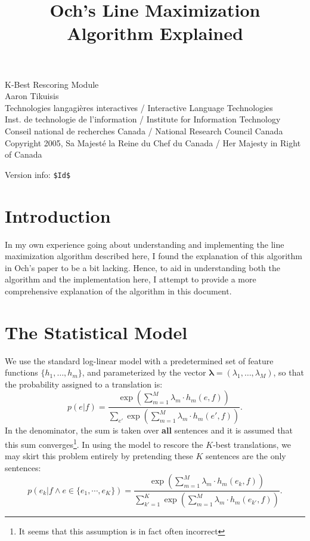 \documentclass[12pt]{amsart}
\begin{document}
\title{Och's Line Maximization Algorithm Explained}
\maketitle

{\tiny
\noindent
K-Best Rescoring Module\\
Aaron Tikuisis\\
Technologies langagi{\`e}res interactives / Interactive Language Technologies\\
Inst. de technologie de l'information / Institute for Information Technology\\
Conseil national de recherches Canada / National Research Council Canada\\
Copyright 2005, Sa Majest{\'e} la Reine du Chef du Canada / Her Majesty in Right of Canada
}

{\tiny
\noindent
Version info: \verb+$Id$+
}
\\

\section{Introduction\label{sec:intro}}
In my own experience going about understanding and implementing the line maximization algorithm described here, I found the explanation of this algorithm in Och's paper to be a bit lacking.
Hence, to aid in understanding both the algorithm and the implementation here, I attempt to provide a more comprehensive explanation of the algorithm in this document.

\section{The Statistical Model\label{sec:model}}
We use the standard log-linear model with a predetermined set of feature functions $\{h_1, \dots , h_m\}$, and parameterized by the vector $\boldsymbol{\lambda} = (\lambda_1, \dots , \lambda_M)$, so that the probability assigned to a translation is:
\[ p(e|f) = \frac
{\exp \left( \sum_{m=1}^M \lambda_m \cdot h_m(e,f) \right)}
{\sum_{e'} \exp \left( \sum_{m=1}^M \lambda_m \cdot h_m(e',f) \right)}. \]
In the denominator, the sum is taken over \textbf{all} sentences and it is assumed that this sum converges\footnote{It seems that this assumption is in fact often incorrect}.
In using the model to rescore the $K$-best translations, we may skirt this problem entirely by pretending these $K$ sentences are the only sentences:
\[ p(e_k|f \land e \in \{e_1, \cdots , e_K\}) = \frac
{\exp \left( \sum_{m=1}^M \lambda_m \cdot h_m(e_k,f) \right)}
{\sum_{k'=1}^K \exp \left( \sum_{m=1}^M \lambda_m \cdot h_m(e_{k'},f) \right)}. \]
\end{document}

